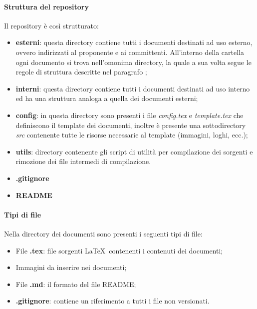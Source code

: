 \paragraph{Struttura del repository}
\label{par:struttura_repo}

Il repository  è così strutturato:
\begin{itemize}
    \item \textbf{esterni}: questa directory contiene tutti i documenti destinati ad uso esterno, ovvero 
    indirizzati al proponente e ai committenti. All'interno della cartella ogni documento si trova nell'omonima 
    directory, la quale a sua volta segue le regole di struttura descritte nel paragrafo ;
    \item \textbf{interni}: questa directory contiene tutti i documenti destinati ad uso interno ed ha una 
    struttura analoga a quella dei documenti esterni;
    \item \textbf{config}: in questa directory sono presenti i file \emph{config.tex} e \emph{template.tex} 
    	che definiscono il template dei documenti, inoltre è presente una sottodirectory \emph{src} contenente tutte le risorse necessarie al template (immagini, loghi, ecc.);
    \item \textbf{utils}: directory contenente gli script di utilit\`{a} per compilazione dei sorgenti e rimozione dei file intermedi di compilazione.
    \item \textbf{.gitignore}
    \item \textbf{README}
\end{itemize}

\paragraph{Tipi di file}
\label{par:tipi_file}
Nella directory dei documenti sono presenti i seguenti tipi di file:
\begin{itemize}
    \item File \textbf{.tex}: file sorgenti \LaTeX\ contenenti i contenuti dei documenti;
    \item Immagini da inserire nei documenti;
    \item File \textbf{.md}: il formato del file README;
    \item \textbf{.gitignore}: contiene un riferimento a tutti i file non versionati.
\end{itemize}

